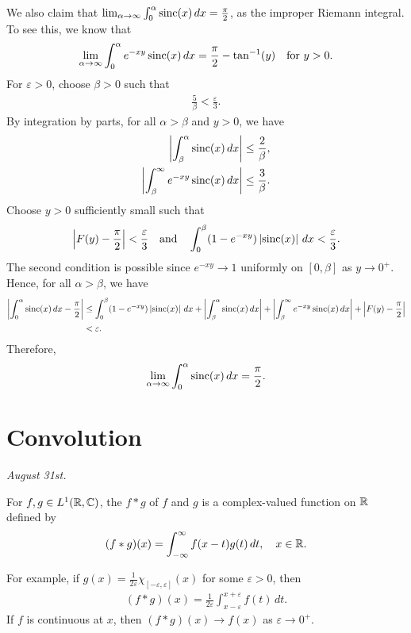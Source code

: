 We also claim that $\lim_{\alpha \to \infty} \int_{0}^{\alpha} \operatorname{sinc}(x) \, dx = \frac{\pi}{2}$, as the improper Riemann integral. To see this, we know that
\begin{align}
    \lim_{\alpha \to \infty} \int_{0}^{\alpha} e^{-xy}\operatorname{sinc}(x) \, dx = \frac{\pi}{2} - \tan^{-1}(y) \quad \text{for } y > 0.
\end{align}
For $\varepsilon > 0$, choose $\beta > 0$ such that
\begin{align}
    \frac{5}{\beta} < \frac{\varepsilon}{3}.
\end{align}
By integration by parts, for all $\alpha > \beta$ and $y > 0$, we have
\begin{align}
    \left| \int_{\beta}^{\alpha} \operatorname{sinc}(x) \, dx \right| &\leq \frac{2}{\beta}, \\
    \left| \int_{\beta}^{\infty} e^{-xy}\operatorname{sinc}(x) \, dx \right| &\leq \frac{3}{\beta}.
\end{align}
Choose $y > 0$ sufficiently small such that
\begin{align}
    \left| F(y)-\frac{\pi}{2} \right| < \frac{\varepsilon}{3}
    \quad \text{and} \quad
    \int_{0}^{\beta} (1-e^{-xy})\left| \operatorname{sinc}(x) \right| \, dx < \frac{\varepsilon}{3}.
\end{align}
The second condition is possible since $e^{-xy} \to 1$ uniformly on $[0,\beta]$ as $y \to 0^{+}$. Hence, for all $\alpha > \beta$, we have
\begin{align}
    \left| \int_{0}^{\alpha} \operatorname{sinc}(x) \, dx - \frac{\pi}{2} \right|
    &\leq \int_{0}^{\beta} (1-e^{-xy})\left| \operatorname{sinc}(x) \right| \, dx
    + \left| \int_{\beta}^{\alpha} \operatorname{sinc}(x) \, dx \right|
    + \left| \int_{\beta}^{\infty} e^{-xy}\operatorname{sinc}(x) \, dx \right|
    + \left| F(y)-\frac{\pi}{2} \right| \notag \\
    &< \varepsilon.
\end{align}
Therefore,
\begin{align}
    \lim_{\alpha \to \infty} \int_{0}^{\alpha} \operatorname{sinc}(x) \, dx = \frac{\pi}{2}.
\end{align}

\section{Convolution}
\textit{August 31st.}

\begin{definition}
    For $f,g \in L^{1}(\mathbb{R},\mathbb{C})$, the  $f * g$ of $f$ and $g$ is a complex-valued function on $\mathbb{R}$ defined by
    \begin{align}
        (f * g)(x) = \int_{-\infty}^{\infty} f(x-t)g(t) \, dt, \quad x \in \mathbb{R}.
    \end{align}
\end{definition}
\noindent For example, if $g(x) = \frac{1}{2 \varepsilon} \chi_{[-\varepsilon,\varepsilon]}(x)$ for some $\varepsilon > 0$, then
\begin{align}
    (f * g)(x) = \frac{1}{2 \varepsilon} \int_{x-\varepsilon}^{x+\varepsilon} f(t) \, dt.
\end{align}
If $f$ is continuous at $x$, then $(f * g)(x) \to f(x)$ as $\varepsilon \to 0^{+}$.

